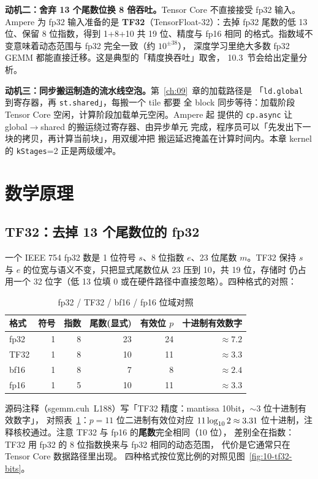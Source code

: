 \textbf{动机二：舍弃 13 个尾数位换 8 倍吞吐。}\allowbreak{}Tensor Core 不直接接受
fp32 输入。Ampere 为 fp32 输入准备的是 \textbf{TF32}（TensorFloat-32）：去掉
fp32 尾数的低 13 位、保留 8 位指数，得到 1+8+10 共 19 位、精度与 fp16 相同
的格式。指数域不变意味着动态范围与 fp32 完全一致（约 $10^{\pm38}$），
深度学习里绝大多数 fp32 GEMM 都能直接迁移。这是典型的「精度换吞吐」取舍，
10.3~节会给出定量分析。

\textbf{动机三：同步搬运制造的流水线空泡。}第~\ref{ch:09}~章的加载路径是
「\texttt{ld.global} 到寄存器，再 \texttt{st.shared}」，每搬一个 tile 都要
全 block 同步等待：加载阶段 Tensor Core 空闲，计算阶段加载单元空闲。Ampere 起
提供的 \texttt{cp.async} 让 global$\to$shared 的搬运绕过寄存器、由异步单元
完成，程序员可以「先发出下一块的拷贝，再计算当前块」，用双缓冲把
搬运延迟掩盖在计算时间内。本章 kernel 的 \texttt{kStages}=2 正是两级缓冲。

\section{数学原理}

\subsection{TF32：去掉 13 个尾数位的 fp32}

一个 IEEE 754 fp32 数是 1 位符号 $s$、8 位指数 $e$、23 位尾数 $m$。TF32 保持
$s$ 与 $e$ 的位宽与语义不变，只把显式尾数位从 23 压到 10，共 19 位，存储时
仍占用一个 32 位字（低 13 位填 0 或在硬件路径中直接忽略）。四种格式的对照：
\begin{table}[htbp]
\centering
\caption{fp32 / TF32 / bf16 / fp16 位域对照}
\label{tab:10-fmt}
\begin{tabular}{lrrrrr}
\toprule
格式 & 符号 & 指数 & 尾数(显式) & 有效位 $p$ & 十进制有效数字 \\
\midrule
fp32 & 1 & 8 & 23 & 24 & $\approx 7.2$ \\
TF32 & 1 & 8 & 10 & 11 & $\approx 3.3$ \\
bf16 & 1 & 8 & 7  & 8  & $\approx 2.4$ \\
fp16 & 1 & 5 & 10 & 11 & $\approx 3.3$ \\
\bottomrule
\end{tabular}
\end{table}
源码注释（sgemm.cuh~L188）写「TF32 精度：mantissa 10bit，$\sim$3 位十进制有效数字」，
对照表~\ref{tab:10-fmt}：$p=11$ 位二进制有效位对应 $11 \log\sb {10} 2 \approx 3.31$
位十进制，注释核校通过。注意 TF32 与 fp16 的\textbf{尾数}完全相同（10 位），
差别全在指数：TF32 用 fp32 的 8 位指数换来与 fp32 相同的动态范围，
代价是它通常只在 Tensor Core 数据路径里出现。
四种格式按位宽比例的对照见图~\ref{fig:10-tf32-bits}。

